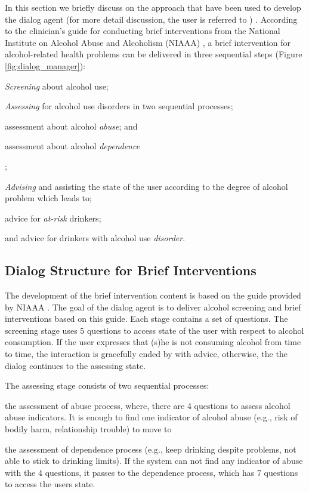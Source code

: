 \documentclass[letterpaper]{article}
\begin{document}
In this section we briefly discuss on the approach that have been used to develop the dialog 
agent (for more detail discussion, the user is referred to \cite{YASCLL14}) . According to the 
clinician's guide for conducting brief interventions from the National Institute on Alcohol Abuse 
and Alcoholism (NIAAA) \cite{national2007helping}, a brief intervention for alcohol-related health 
problems can be delivered in three sequential steps (Figure 
\ref{fig:dialog_manager}): \begin{inparaenum}[1)] \item {\em Screening} about alcohol use; \item 
{\em Assessing} for alcohol use disorders in two sequential processes; \begin{inparaenum}[a)] \item 
assessment about alcohol {\em abuse}; and \item assessment about alcohol {\em 
dependence}\end{inparaenum}; \item {\em Advising} and assisting the state of the user according to 
the degree of alcohol problem which leads to; \begin{inparaenum} \item advice for {\em at-risk} 
drinkers; \item and advice for drinkers with alcohol use {\em disorder}. \end{inparaenum} 
\end{inparaenum}

\subsection*{Dialog Structure for Brief Interventions}

The development of the brief intervention content is based on the guide provided by 
NIAAA \cite{national2006niaaa}. The goal of the dialog agent is to deliver alcohol screening and 
brief interventions based on this guide. Each stage contains a set of questions. The screening stage 
uses 5 questions to access state of the user with respect to alcohol consumption.  If the user 
expresses that (s)he is not consuming alcohol from time to time, the interaction is gracefully ended 
by with advice, otherwise, the the dialog continues to the assessing state.  

The assessing stage consists of two sequential processes: \begin{inparaenum}[1)] \item the 
assessment of abuse process, where, there are 4 questions to assess alcohol abuse indicators.  It is 
enough to find one indicator of alcohol abuse (e.g., risk of bodily harm, relationship trouble) to 
move to \item the assessment of dependence process (e.g., keep drinking despite problems, not able 
to stick to drinking limits). If the system can not find any indicator of abuse with the 4 
questions, it passes to the dependence process, which has  7 questions to access the users state. 
\end{inparaenum}
\end{document}
